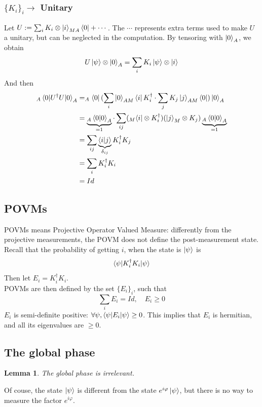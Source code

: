\documentclass{article}
\newtheorem{lemma}{Lemma}
\begin{document}
\subsubsection*{$\{K_i\}_i \rightarrow$ Unitary} Let $U := \sum_i K_i \otimes
\ket{i}_{MA}\bra{0} + \cdots $. The $\cdots$ represents extra terms used to make
$U$ a unitary, but can be neglected in the computation. By tensoring with
$\ket{0}_A$, we obtain
\begin{equation}
    U\ket{\psi}\otimes \ket{0}_A = \sum_i K_i \ket{\psi}\otimes\ket{i}
\end{equation}
And then
\begin{equation}
    \begin{aligned}
        _A\braket{0 |U^\dagger U|0}_A
            & = _A\bra{0}(\sum_i\ket{0}_{AM}\bra{i} K_i^\dagger \cdot \sum_j
            K_j\ket{j}_{AM}\bra{0})\ket{0}_A \\
            & = \underbrace{_A\braket{0|0}_A}_{=1} \cdot \sum_{ij}(_M\bra{i}\otimes
            K_i^\dagger)(\ket{j}_M\otimes K_j) \underbrace{_A\braket{0|0}_A}_{=1} \\
            & = \sum_{ij}\underbrace{\braket{i|j}}_{\delta_{ij}} K_i^\dagger K_j \\
            & = \sum_i K_i^\dagger K_i \\
            & = Id
    \end{aligned}
\end{equation}
\subsection{POVMs}
POVMs means Projective Operator Valued Measure: differently from the projective
measurements, the POVM does not define the post-measurement state.\\
Recall that the probability of getting $i$, when the state is $\ket{\psi}$ is
\begin{equation}
\braket{\psi | K_i^\dagger K_i | \psi}
\end{equation}
Then let $E_i = K_i^\dagger K_i$.\\\noindent POVMs are then defined by the set
$\{E_i\}_i$, such that
\begin{equation}
\sum_i E_i = Id, \quad E_i\geq 0
\end{equation}
$E_i$ is semi-definite positive: $ \forall \psi, \braket{\psi|E_i|\psi} \geq 0$.
This implies that $E_i$ is hermitian, and all its eigenvalues are $\geq 0$.

\subsection{The global phase}\label{global-phase}
\begin{lemma}
The global phase is irrelevant.
\end{lemma}
Of couse, the state $\ket{\psi}$ is different from the state
$e^{i\varphi}\ket{\psi}$, but there is no way to measure the factor
$e^{i\varphi}$.
\end{document}
